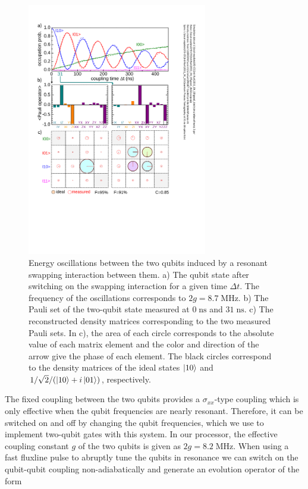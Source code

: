 \begin{figure}
	\centering
		\includegraphics[width=0.7\textwidth]{./material/papers/iswap/submission1/Dewes_Figure2}
	\caption[Generating entangled two-qubit states by swapping interaction]{Energy oscillations between the two qubits induced by a resonant swapping interaction between them. a) The qubit state after switching on the swapping interaction for a given time $\Delta t$. The frequency of the oscillations corresponds to $2g = 8.7 \; \mathrm{MHz}$. b) The Pauli set of the two-qubit state measured at $0\; \mathrm{ns}$ and $31\; \mathrm{ns}$. c) The reconstructed density matrices corresponding to the two measured Pauli sets. In c), the area of each circle corresponds to the absolute value of each matrix element and the color and direction of the arrow give the phase of each element. The black circles correspond to the density matrices of the ideal states $\left| 10 \right>$ and $1/\sqrt{2}/(\left| 10 \right>+i\left| 01 \right>)$, respectively.}
	\label{fig:swap_interaction_state_tomography}
\end{figure}

The fixed coupling between the two qubits provides a $\sigma_{xx}$-type coupling which is only effective when the qubit frequencies are nearly resonant. Therefore, it can be switched on and off by changing the qubit frequencies, which we use to implement two-qubit gates with this system. In our processor, the effective coupling constant $g$ of the two qubits is given as $2g = 8.2 \; \mathrm{MHz}$. When using a fast fluxline pulse to abruptly tune the qubits in resonance we can switch on the qubit-qubit coupling non-adiabatically and generate an evolution operator of the form

